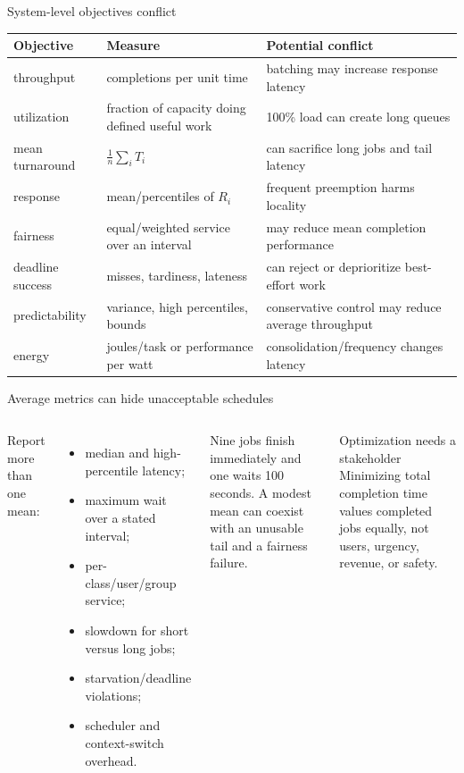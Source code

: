 \documentclass[aspectratio=169,11pt]{beamer}
\begin{document}
\begin{frame}{System-level objectives conflict}
  \small
  \begin{tabularx}{\textwidth}{@{}lXX@{}}
    \toprule
    \textbf{Objective} & \textbf{Measure} & \textbf{Potential conflict} \\
    \midrule
    throughput & completions per unit time & batching may increase response latency \\
    utilization & fraction of capacity doing defined useful work & 100\% load can create long queues \\
    mean turnaround & $\frac1n\sum_i T_i$ & can sacrifice long jobs and tail latency \\
    response & mean/percentiles of $R_i$ & frequent preemption harms locality \\
    fairness & equal/weighted service over an interval & may reduce mean completion performance \\
    deadline success & misses, tardiness, lateness & can reject or deprioritize best-effort work \\
    predictability & variance, high percentiles, bounds & conservative control may reduce average throughput \\
    energy & joules/task or performance per watt & consolidation/frequency changes latency \\
    \bottomrule
  \end{tabularx}
\end{frame}

\begin{frame}{Average metrics can hide unacceptable schedules}
  \begin{columns}[T,onlytextwidth]
      Report more than one mean:
      \begin{itemize}
        \item median and high-percentile latency;
        \item maximum wait over a stated interval;
        \item per-class/user/group service;
        \item slowdown for short versus long jobs;
        \item starvation/deadline violations;
        \item scheduler and context-switch overhead.
      \end{itemize}
      \begin{tcolorbox}[title=Example]
        Nine jobs finish immediately and one waits 100 seconds. A modest mean can coexist with an unusable tail and a fairness failure.
      \end{tcolorbox}
      \begin{alertblock}{Optimization needs a stakeholder}
        Minimizing total completion time values completed jobs equally, not users, urgency, revenue, or safety.
      \end{alertblock}
  \end{columns}
\end{frame}
\end{document}
